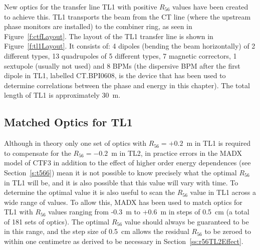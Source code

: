 New optics for the transfer line TL1 with positive \(R_{56}\) values have been created to achieve this.
TL1 transports the beam from the CT line (where the upstream phase monitors are installed) to the combiner ring, as seen in Figure~\ref{f:ctfLayout}. 
The layout of the TL1 transfer line is shown in Figure~\ref{f:tl1Layout}. It consists of: 4 dipoles (bending the beam horizontally) of 2 different types, 13 quadrupoles of 5 different types, 7 magnetic correctors, 1 sextupole (usually not used) and 8 BPMs \cite{tl1Design} (the dispersive BPM after the first dipole in TL1, labelled CT.BPI0608, is the device that has been used to determine correlations between the phase and energy in this chapter). The total length of TL1 is approximately 30~m.




\subsection{Matched Optics for TL1}
\label{ss:tl1Optics}

Although in theory only one set of optics with \(R_{56} = +0.2\)~m in TL1 is required to compensate for the \(R_{56} = -0.2\)~m in TL2, in practice errors in the MADX model of CTF3 in addition to the effect of higher order energy dependences (see Section~\ref{s:t566}) mean it is not possible to know precisely what the optimal \(R_{56}\) in TL1 will be, and it is also possible that this value will vary with time. To determine the optimal value it is also useful to scan the \(R_{56}\) value in TL1 across a wide range of values.%
To allow this, MADX has been used to match optics for TL1 with \(R_{56}\) values ranging from -0.3~m to +0.6~m in steps of 0.5~cm (a total of 181 sets of optics). The optimal \(R_{56}\) value should always be guaranteed to be in this range, and the step size of 0.5~cm allows the residual \(R_{56}\) to be zeroed to within one centimetre as derived to be necessary in Section~\ref{ss:r56TL2Effect}. 

